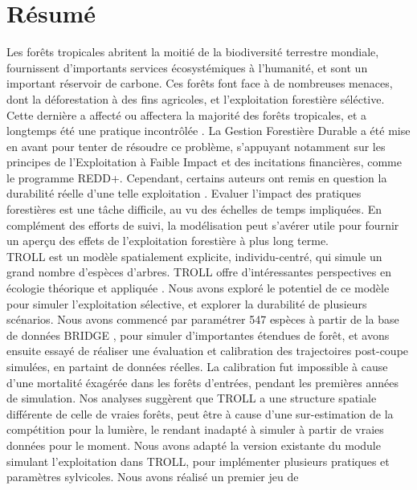 \documentclass[12pt,]{article}
\let\oldsection\section
\renewcommand\section{\newpage\oldsection}
\theoremstyle{definition}
\theoremstyle{definition}
\theoremstyle{definition}
\theoremstyle{remark}
\begin{document}
\tableofcontents

\section*{Résumé}\label{resume}

Les forêts tropicales abritent la moitié de la biodiversité terrestre
mondiale, fournissent d'importants services écosystémiques à l'humanité,
et sont un important réservoir de carbone. Ces forêts font face à de
nombreuses menaces, dont la déforestation à des fins agricoles, et
l'exploitation forestière séléctive. Cette dernière a affecté ou
affectera la majorité des forêts tropicales, et a longtemps été une
pratique incontrôlée \citep{Nasi2009}. La Gestion Forestière Durable a
été mise en avant pour tenter de résoudre ce problème, s'appuyant
notamment sur les principes de l'Exploitation à Faible Impact
\citep[EFI,][]{Putz2008} et des incitations financières, comme le
programme REDD+. Cependant, certains auteurs ont remis en question la
durabilité réelle d'une telle exploitation
\citep{Kormos2012, Pearce2003}. Evaluer l'impact des pratiques
forestières est une tâche difficile, au vu des échelles de temps
impliquées. En complément des efforts de suivi, la modélisation peut
s'avérer utile pour fournir un aperçu des effets de l'exploitation
forestière à plus long terme.\\
TROLL est un modèle spatialement explicite, individu-centré, qui simule
un grand nombre d'espèces d'arbres. TROLL offre d'intéressantes
perspectives en écologie théorique et appliquée
\citep[\citet{Chave1999b}]{Marechaux2017a}. Nous avons exploré le
potentiel de ce modèle pour simuler l'exploitation sélective, et
explorer la durabilité de plusieurs scénarios. Nous avons commencé par
paramétrer 547 espèces à partir de la base de données BRIDGE
\citep{Baraloto2010}, pour simuler d'importantes étendues de forêt, et
avons ensuite essayé de réaliser une évaluation et calibration des
trajectoires post-coupe simulées, en partaint de données réelles. La
calibration fut impossible à cause d'une mortalité éxagérée dans les
forêts d'entrées, pendant les premières années de simulation. Nos
analyses suggèrent que TROLL a une structure spatiale différente de
celle de vraies forêts, peut être à cause d'une sur-estimation de la
compétition pour la lumière, le rendant inadapté à simuler à partir de
vraies données pour le moment. Nous avons adapté la version existante du
module simulant l'exploitation dans TROLL, pour implémenter plusieurs
pratiques et paramètres sylvicoles. Nous avons réalisé un premier jeu de
\end{document}
